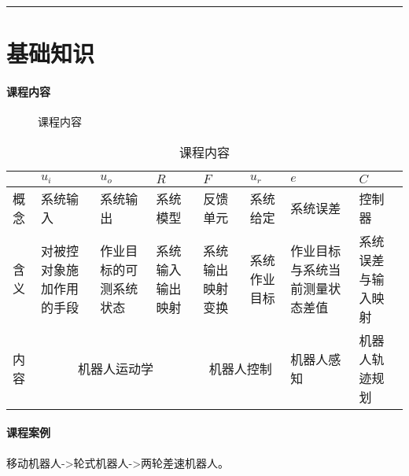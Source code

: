 \documentclass[
12pt, %
a4paper, 
oneside, %
headinclude,footinclude, %
]{scrartcl}
\title{\normalfont\spacedallcaps{智能工程}}
\date{}
\begin{document}
\maketitle
\newpage
\hypertarget{toc}{}
\begingroup
\begin{multicols}{2}
\tableofcontents
\end{multicols}
\endgroup
\newpage
\begingroup
\begin{multicols}{2}
\listoffigures
\end{multicols}
\endgroup
\hrule
\begingroup
\begin{multicols}{2}
\listoftables
\end{multicols}
\endgroup
\newpage
\listoftips
\newpage
\section{基础知识}
\paragraph{课程内容}
\begin{figure}[H]
\centering
{} \quad
{}
\caption{课程内容}
\end{figure}

\begin{table}[H]
\centering
\begin{tabular}{|p{0.5cm}|p{2cm}|p{2cm}|p{2cm}|p{2cm}|p{2cm}|p{2cm}|p{2cm}|}
\hline
& $ u_i $ & $ u_o $ & $ R $ & $ F $ & $ u_r $ & $ e $ & $ C $ \\
\hline
概念 & 系统输入 & 系统输出 & 系统模型 & 反馈单元 & 系统给定 & 系统误差 & 控制器 \\
\hline
含义 & 对被控对象施加作用的手段 & 作业目标的可测系统状态 & 系统输入输出映射 & 系统输出映射变换 & 系统作业目标 & 作业目标与系统当前测量状态差值 & 系统误差与输入映射 \\
\hline
内容 & \multicolumn{3}{c|}{机器人运动学} & \multicolumn{2}{c|}{机器人控制} & 机器人感知 & 机器人轨迹规划 \\
\hline
\end{tabular}
\caption{课程内容}
\end{table}
\paragraph{课程案例}\label{sec:two_wheel}
移动机器人->轮式机器人->两轮差速机器人。
\end{document}
